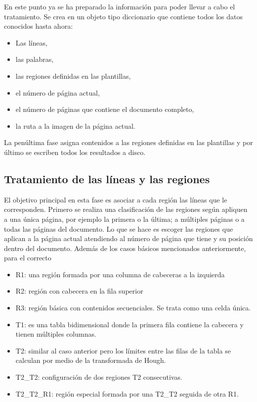 En este punto ya se ha preparado la información para poder llevar a cabo el tratamiento. Se crea en un objeto tipo diccionario que contiene todos los datos conocidos hasta ahora:

\begin{itemize}
    \item Las líneas,
    \item las palabras,
    \item las regiones definidas en las plantillas,
    \item el número de página actual,
    \item el número de páginas que contiene el documento completo,
    \item la ruta a la imagen de la página actual.
\end{itemize}

La penúltima fase asigna contenidos a las regiones definidas en las plantillas y por último se escriben todos los resultados a disco.

\subsection{Tratamiento de las líneas y las regiones}

El objetivo principal en esta fase es asociar a cada región las líneas que le corresponden. Primero se realiza una clasificación de las regiones según apliquen a una única página, por ejemplo la primera o la última; a múltiples páginas o a todas las páginas del documento. Lo que se hace es escoger las regiones que aplican a la página actual atendiendo al número de página que tiene y su posición dentro del documento. Además de los casos básicos mencionados anteriormente, para el correcto %

\begin{itemize}
    \item R1: una región formada por una columna de cabeceras a la izquierda
    \item R2: región con cabecera en la fila superior
    \item R3: región básica con contenidos secuenciales. Se trata como una celda única.
    \item T1: es una tabla bidimensional donde la primera fila contiene la cabecera y tienen múltiples columnas.
    \item T2: similar al caso anterior pero los límites entre las filas de la tabla se calculan por medio de la transformada de Hough.
    \item T2\_T2: configuración de dos regiones T2 consecutivas.
    \item T2\_T2\_R1: región especial formada por una T2\_T2 seguida de otra R1.
\end{itemize}

